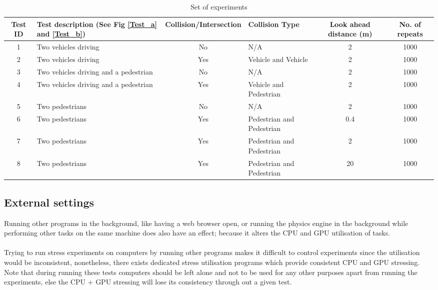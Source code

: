 \begin{table*}[b]
\centering
\begin{tabular}{clclcc}
\toprule
Test ID & Test description (See Fig \ref{Test_a} and \ref{Test_b}) & Collision/Intersection & Collision Type & Look ahead distance (m) & No. of repeats \\ \midrule
1       & Two vehicles driving                   & No  & N/A & 2 & 1000 \\
2       & Two vehicles driving                   & Yes & Vehicle and Vehicle & 2 & 1000 \\
3       & Two vehicles driving and a pedestrian  & No  & N/A & 2 & 1000 \\
4       & Two vehicles driving and a pedestrian  & Yes & Vehicle and Pedestrian & 2 & 1000 \\
5       & Two pedestrians                        & No  & N/A & 2 & 1000 \\
6       & Two pedestrians                        & Yes & Pedestrian and Pedestrian & 0.4 & 1000 \\
7       & Two pedestrians                        & Yes & Pedestrian and Pedestrian & 2 & 1000 \\
8       & Two pedestrians                        & Yes & Pedestrian and Pedestrian & 20 & 1000 \\
\bottomrule
\end{tabular}
\caption{Set of experiments}
\label{TableOfExperiments}
\end{table*}

\subsection{External settings}
\noindent Running other programs in the background, like having a web browser open, or running the physics engine in the background while performing other tasks on the same machine does also have an effect; because it alters the CPU and GPU utilisation of tasks.\\\\ 
\noindent Trying to run stress experiments on computers by running other programs makes it difficult to control experiments since the utilisation would be inconsistent, nonetheless, there exists dedicated stress utilisation programs which provide consistent CPU and GPU stressing. Note that during running these tests computers should be left alone and not to be used for any other purposes apart from running the experiments, else the CPU + GPU stressing will lose its consistency through out a given test. 

